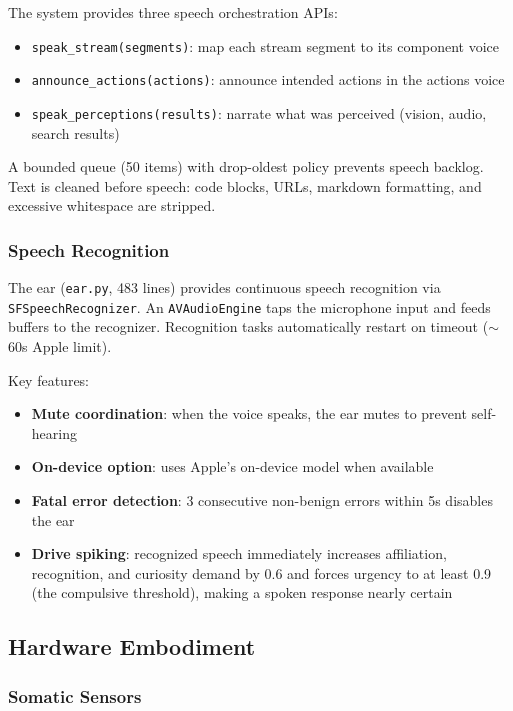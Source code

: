 \documentclass[11pt,oneside]{article}
\begin{document}
The system provides three speech orchestration APIs:

\begin{itemize}
  \item \texttt{speak\_stream(segments)}: map each stream segment to its component voice
  \item \texttt{announce\_actions(actions)}: announce intended actions in the actions voice
  \item \texttt{speak\_perceptions(results)}: narrate what was perceived (vision, audio, search results)
\end{itemize}

A bounded queue (50 items) with drop-oldest policy prevents speech backlog.
Text is cleaned before speech: code blocks, URLs, markdown formatting, and excessive whitespace are stripped.

\subsubsection{Speech Recognition}

The ear (\texttt{ear.py}, 483 lines) provides continuous speech recognition via \texttt{SFSpeechRecognizer}.
An \texttt{AVAudioEngine} taps the microphone input and feeds buffers to the recognizer.
Recognition tasks automatically restart on timeout ($\sim$60s Apple limit).

Key features:
\begin{itemize}
  \item \textbf{Mute coordination}: when the voice speaks, the ear mutes to prevent self-hearing
  \item \textbf{On-device option}: uses Apple's on-device model when available
  \item \textbf{Fatal error detection}: 3 consecutive non-benign errors within 5s disables the ear
  \item \textbf{Drive spiking}: recognized speech immediately increases affiliation, recognition, and curiosity demand by 0.6 and forces urgency to at least 0.9 (the compulsive threshold), making a spoken response nearly certain
\end{itemize}

\subsection{Hardware Embodiment}

\subsubsection{Somatic Sensors}
\end{document}
